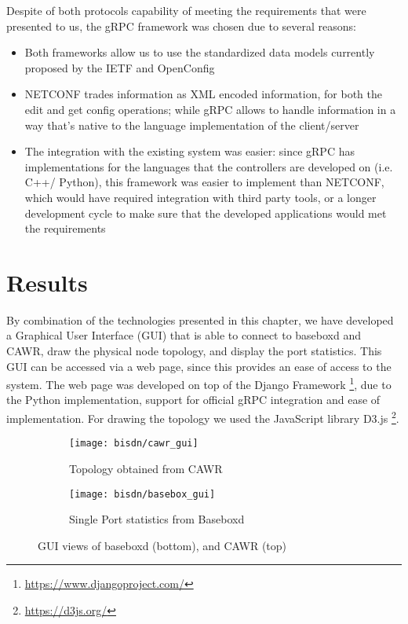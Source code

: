 \par Despite of both protocols capability of meeting the requirements that were presented to us, the gRPC framework was chosen due to several reasons:

\begin {itemize}
    \item Both frameworks allow us to use the standardized data models currently proposed by the IETF and OpenConfig
    \item NETCONF trades information as XML encoded information, for both the edit and get config operations; while gRPC allows to handle information in a way
        that’s native to the language implementation of the client/server
    \item The integration with the existing system was easier: since gRPC has implementations for the languages that the controllers are developed on
        (i.e. C++/ Python), this framework was easier to implement 
        than NETCONF, which would have required integration with third party tools, or a longer development cycle to make sure that the developed applications would
        met the requirements
\end {itemize}

\section {Results}

By combination of the technologies presented in this chapter, we have developed a Graphical User Interface (GUI) that is able to connect to baseboxd and CAWR,
draw the physical node topology, and display the port statistics. This GUI can be accessed via a web page, since this provides an ease of access to the system. 
The web page was developed on top of the Django Framework \footnote{\url{https://www.djangoproject.com/}}, due to the Python implementation, support for official
gRPC integration and ease of implementation. For drawing the topology we used the JavaScript library D3.js \footnote{\url{https://d3js.org/}}.

\begin{figure} [H]
    \begin{subfigure}
        \centering
        \texttt{[image: bisdn/cawr\_gui]}
        \caption{Topology obtained from CAWR}
    \end{subfigure}
    \begin{subfigure}
        \centering
        \texttt{[image: bisdn/basebox\_gui]}
        \caption{Single Port statistics from Baseboxd}
    \end{subfigure}
    \caption{GUI views of baseboxd (bottom), and CAWR (top)}
\end{figure}

